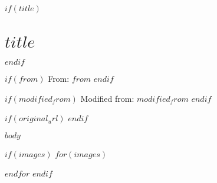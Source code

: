 $if(title)$

\section{$title$}
$endif$

$if(from)$
From: $from$
$endif$

$if(modified_from)$
Modified from: $modified_from$
$endif$

$if(original_url)$
$endif$

$body$

$if(images)$
$for(images)$

$endfor$
$endif$
